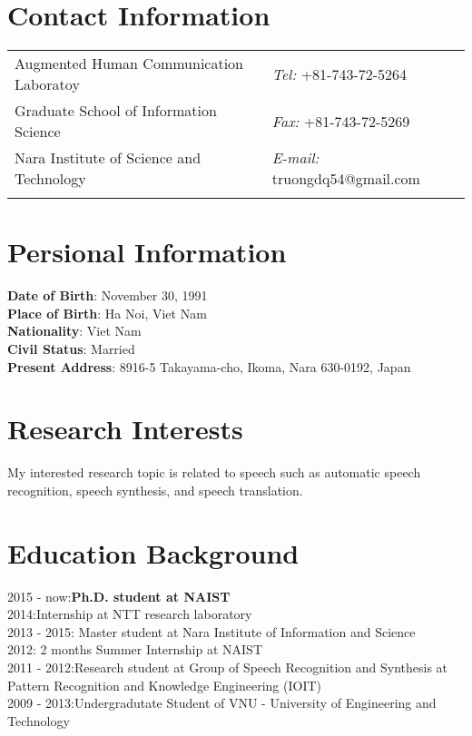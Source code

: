 \documentclass[margin,line]{res}
\newcommand{\tab}{\hspace*{2em}}
\begin{document}

\begin{resume}
\section{\sc Contact Information}
\vspace{.05in}
\begin{tabular}{@{}p{2in}p{4in}}
Augmented Human Communication Laboratoy            & {\it Tel:}  +81-743-72-5264 \\
Graduate School of Information Science   & {\it Fax:}    +81-743-72-5269 \\
Nara Institute of Science and Technology & {\it E-mail:}  truongdq54@gmail.com\\
  & 	%
\end{tabular}

\section{\sc Persional Information}
\textbf{Date of Birth}: 		November 30, 1991	\\
\textbf{Place of Birth}: 	Ha Noi, Viet Nam	\\
\textbf{Nationality}:		Viet Nam	\\
\textbf{Civil Status}:		Married	\\
\textbf{Present Address}:	8916-5 Takayama-cho, Ikoma, Nara 630-0192, Japan	\\

\section{\sc Research Interests}
My interested research topic is related to speech such as automatic speech recognition, speech synthesis, and speech translation.
\section{\sc Education Background}
2015 - now:\tab \hspace{0.3em}\textbf{Ph.D. student at NAIST} \\
2014:\tab \tab \hspace{1.1em}Internship at NTT research laboratory \\
2013 - 2015: \tab Master student at Nara Institute of Information and Science \\
2012:\tab \tab \hspace{0.7em} 2 months Summer Internship at NAIST\\
2011 - 2012:\tab Research student at Group of Speech Recognition and Synthesis at Pattern Recognition and Knowledge Engineering (IOIT)\\
2009 - 2013:\tab Undergradutate Student of VNU - University of Engineering and Technology\\

\end{resume}
\end{document}
